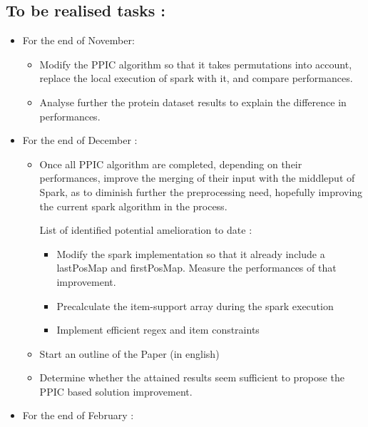 \documentclass[10pt]{article}
\begin{document}
\subsection{To be realised tasks :}

\begin{itemize}
\item For the end of November:

	\begin{itemize}
	\item Modify the PPIC algorithm so that it takes permutations into account, replace the local execution of spark with it, and compare performances.
	\item  Analyse further the protein dataset results to explain the difference in performances.
	\end{itemize}
	
\item For the end of December :

	\begin{itemize}
 	\item Once all PPIC algorithm are completed, depending on their performances, improve the merging of their input with the middleput of Spark, as to diminish further the preprocessing need,
hopefully improving the current spark algorithm in the process.\newline
	
	List of identified potential amelioration to date : 

	\begin{itemize}
	
	\item Modify the spark implementation so that it already include a lastPosMap and firstPosMap. Measure the performances of that improvement.

	\item Precalculate the item-support array during the spark execution

	\item Implement efficient regex and item constraints
	\end{itemize}
	
	\item Start an outline of the Paper (in english)
	\item Determine whether the attained results seem sufficient to propose the PPIC based solution improvement.
	\end{itemize}

\item For the end of February :


\end{itemize}
\end{document}

